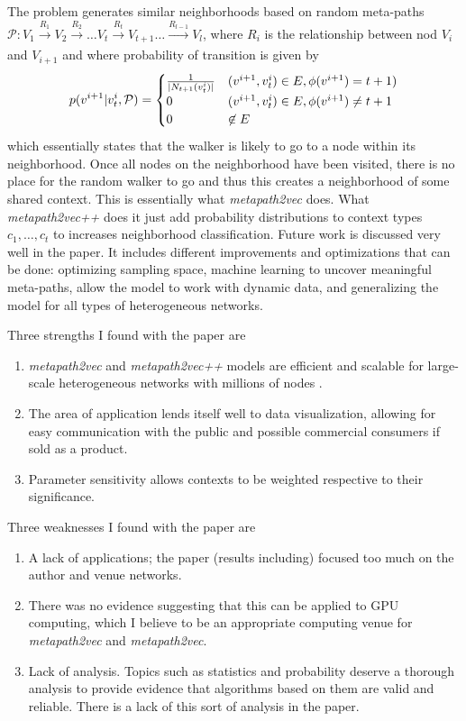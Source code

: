 \documentclass[12pt]{article}
\DeclarePairedDelimiter \abs{\lvert}{\rvert}%
\theoremstyle{remark}
\begin{document}
The problem generates similar neighborhoods based on random meta-paths $\mathcal{P}: V_1 \xrightarrow[]{R_1} V_2 \xrightarrow[]{R_2} \dots V_t \xrightarrow[]{R_t} V_{t+1} \dots \xrightarrow[]{R_{l-1}} V_l$, where $R_i$ is the relationship between nod $V_i$ and $V_{i+1}$ and where probability of transition is given by 
\begin{align*}
	p(v^{i+1} | v_t^i, \mathcal{P}) = 
	\begin{cases}
	\frac{1}{\abs{N_{t+1}(v_t^i)}} & (v^{i+1}, v_t^i) \in E, \phi(v^{i+1}) = t+1) \\
	0 & (v^{i+1}, v_t^i) \in E, \phi(v^{i+1}) \neq t+1 \\
	0 & \not\in E	
	\end{cases}
\end{align*}
which essentially states that the walker is likely to go to a node within its neighborhood. Once all nodes on the neighborhood have been visited, there is no place for the random walker to go and thus this creates a neighborhood of some shared context. This is essentially what \textit{metapath2vec} does. What \textit{metapath2vec++} does it just add probability distributions to context types $c_1, \dots, c_t$ to increases neighborhood classification. Future work is discussed very well in the paper. It includes different improvements and optimizations that can be done: optimizing sampling space, machine learning to uncover meaningful meta-paths, allow the model to work with dynamic data, and generalizing the model for all types of heterogeneous networks.  

\newpage

Three strengths I found with the paper are
\begin{enumerate}
	\item \textit{metapath2vec} and \textit{metapath2vec++} models are efficient and scalable for large-scale heterogeneous networks with millions of nodes \cite{paper}.
	\item The area of application lends itself well to data visualization, allowing for easy communication with the public and possible commercial consumers if sold as a product.
	\item Parameter sensitivity allows contexts to be weighted respective to their significance.
\end{enumerate} 
\vspace{0.5cm}

Three weaknesses I found with the paper are
\begin{enumerate}
	\item A lack of applications; the paper (results including) focused too much on the author and venue networks.
	\item There was no evidence suggesting that this can be applied to GPU computing, which I believe to be an appropriate computing venue for \textit{metapath2vec} and \textit{metapath2vec}.
	\item Lack of analysis. Topics such as statistics and probability deserve a thorough analysis to provide evidence that algorithms based on them are valid and reliable. There is a lack of this sort of analysis in the paper. 
\end{enumerate}
\vspace{0.5cm}
\end{document}
